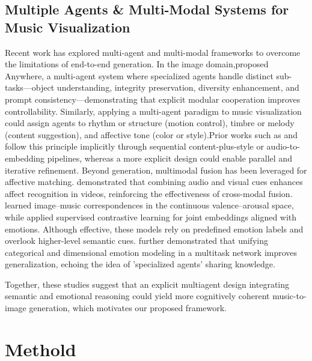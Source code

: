 \documentclass[letterpaper]{article}
\begin{document}
\subsection{Multiple Agents \& Multi-Modal Systems for Music Visualization}
Recent work has explored multi-agent and multi-modal frameworks to overcome the limitations of end-to-end generation.
In the image domain,\cite{xie2025anywhere}proposed Anywhere, a multi-agent system where specialized agents handle distinct sub-tasks—object understanding, integrity preservation, diversity enhancement, and prompt consistency—demonstrating that explicit modular cooperation improves controllability.
Similarly, applying a multi-agent paradigm to music visualization could assign agents to rhythm or structure (motion control), timbre or melody (content suggestion), and affective tone (color or style).Prior works such as \cite{lee2020crossing}and \cite{kim2023sound2vision}follow this principle implicitly through sequential content-plus-style or audio-to-embedding pipelines, whereas a more explicit design could enable parallel and iterative refinement. Beyond generation, multimodal fusion has been leveraged for affective matching. \cite{praveen2022avfusion}demonstrated that combining audio and visual cues enhances affect recognition in videos, reinforcing the effectiveness of cross-modal fusion. \cite{zhao2020emotion}learned image–music correspondences in the continuous valence–arousal space, while \cite{stewart2024emoclim}applied supervised contrastive learning for joint embeddings aligned with emotions.
Although effective, these models rely on predefined emotion labels and overlook higher-level semantic cues. \cite{kang2025unified}further demonstrated that unifying categorical and dimensional emotion modeling in a multitask network improves generalization, echoing the idea of 'specialized agents' sharing knowledge.

Together, these studies suggest that an explicit multiagent design integrating semantic and emotional reasoning could yield more cognitively coherent music-to-image generation, which motivates our proposed framework.

\section{Methold}
\end{document}

